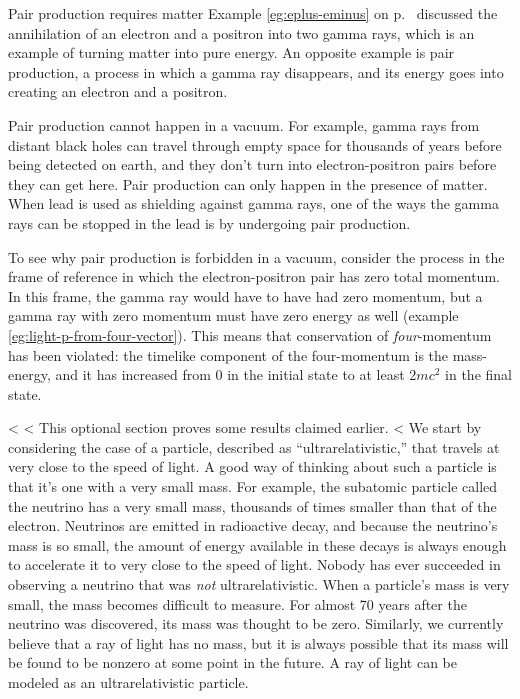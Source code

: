 \begin{eg}{Pair production requires matter}\label{eg:no-pair-prod-in-vacuum}
Example \ref{eg:eplus-eminus} on p.~\pageref{eg:eplus-eminus} discussed the annihilation of
an electron and a positron into two gamma rays, which is an example of turning matter into
pure energy. An opposite example is pair production,
a process in which a gamma ray disappears, and its energy goes into creating an electron and a positron.

Pair production cannot happen in a vacuum. For example, gamma rays from distant black holes
can travel through empty space for thousands of years before being detected on earth, and
they don't turn into electron-positron pairs before they can get here. Pair production can only
happen in the presence of matter. When lead is used as shielding against gamma rays, one of the
ways the gamma rays can be stopped in the lead is by undergoing pair production.

To see why pair production is forbidden in a vacuum, consider the process in the frame of reference
in which the electron-positron pair has zero total momentum. In this frame, the gamma ray would have to
have had zero momentum,
but a gamma ray with zero momentum must have zero energy as well (example \ref{eg:light-p-from-four-vector}).
This means that conservation of 
\emph{four}-momentum
has been violated: the timelike component of the four-momentum is the mass-energy, and it has increased
from 0 in the initial state to at least $2mc^2$ in the final state.
\end{eg}

<%
<%
This optional section proves some results claimed earlier.
<%
We start by considering the case of a particle, described as ``ultrarelativistic,''
that travels at very close to the speed of light.
A good way of thinking about such a particle is that it's one with a
very small mass. For example, the subatomic particle called the neutrino has a very small
mass, thousands of times smaller than that of the electron. Neutrinos are emitted in
radioactive decay, and because the neutrino's mass is so small, the amount of energy
available in these decays is always enough to accelerate it to very close to the speed
of light. Nobody has ever succeeded in observing a neutrino that was \emph{not} ultrarelativistic.
When a particle's mass is very small, the mass becomes difficult to measure. For almost 70 years after the
neutrino was discovered, its mass was thought to be zero. Similarly, we currently believe that
a ray of light has no mass, but it is always possible that its mass will be found to be nonzero
at some point in the future. A ray of light can be modeled as an ultrarelativistic particle.

